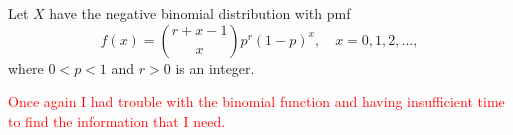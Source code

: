 \documentclass[12pt,letterpaper]{exam}
\begin{document}
\begin{questions}
	\setcounter{question}{37}
	\question  Let $X$ have the negative binomial distribution with pmf
	$$ f(x) = { r + x -1 \choose x} p^r (1-p)^x, \quad x= 0,1,2,...,$$
	where $0 < p< 1$ and $r >0$ is an integer.
	\begin{solution}
		\textcolor{red}{Once again I had trouble with the binomial function and having insufficient time to find the information that I need.}
	\end{solution}

\end{questions}
\end{document}
